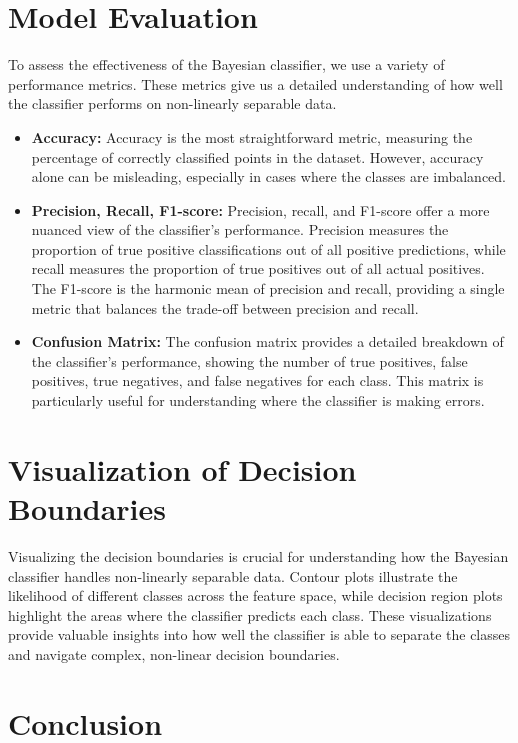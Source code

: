 \documentclass[conference]{IEEEtran}
\begin{document}
\section{Model Evaluation}

To assess the effectiveness of the Bayesian classifier, we use a variety of performance metrics. These metrics give us a detailed understanding of how well the classifier performs on non-linearly separable data.

\begin{itemize}
	\item \textbf{Accuracy:} Accuracy is the most straightforward metric, measuring the percentage of correctly classified points in the dataset. However, accuracy alone can be misleading, especially in cases where the classes are imbalanced.
	\item \textbf{Precision, Recall, F1-score:} Precision, recall, and F1-score offer a more nuanced view of the classifier’s performance. Precision measures the proportion of true positive classifications out of all positive predictions, while recall measures the proportion of true positives out of all actual positives. The F1-score is the harmonic mean of precision and recall, providing a single metric that balances the trade-off between precision and recall.
	\item \textbf{Confusion Matrix:} The confusion matrix provides a detailed breakdown of the classifier’s performance, showing the number of true positives, false positives, true negatives, and false negatives for each class. This matrix is particularly useful for understanding where the classifier is making errors.
\end{itemize}

\section{Visualization of Decision Boundaries}

Visualizing the decision boundaries is crucial for understanding how the Bayesian classifier handles non-linearly separable data. Contour plots illustrate the likelihood of different classes across the feature space, while decision region plots highlight the areas where the classifier predicts each class. These visualizations provide valuable insights into how well the classifier is able to separate the classes and navigate complex, non-linear decision boundaries.


\section{Conclusion}
\end{document}
